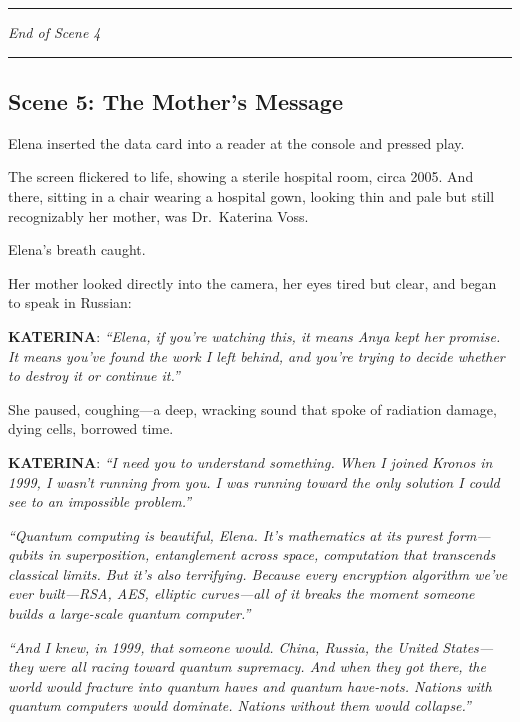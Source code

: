 \begin{center}\rule{0.5\linewidth}{0.5pt}\end{center}

\emph{End of Scene 4}

\begin{center}\rule{0.5\linewidth}{0.5pt}\end{center}

\hypertarget{scene-5-the-mothers-message}{%
\subsection{Scene 5: The Mother's Message}\label{scene-5-the-mothers-message}}

Elena inserted the data card into a reader at the console and pressed play.

The screen flickered to life, showing a sterile hospital room, circa 2005. And there, sitting in a chair wearing a hospital gown, looking thin and pale but still recognizably her mother, was Dr.~Katerina Voss.

Elena's breath caught.

Her mother looked directly into the camera, her eyes tired but clear, and began to speak in Russian:

\textbf{KATERINA}: \emph{``Elena, if you're watching this, it means Anya kept her promise. It means you've found the work I left behind, and you're trying to decide whether to destroy it or continue it.''}

She paused, coughing---a deep, wracking sound that spoke of radiation damage, dying cells, borrowed time.

\textbf{KATERINA}: \emph{``I need you to understand something. When I joined Kronos in 1999, I wasn't running from you. I was running toward the only solution I could see to an impossible problem.''}

\emph{``Quantum computing is beautiful, Elena. It's mathematics at its purest form---qubits in superposition, entanglement across space, computation that transcends classical limits. But it's also terrifying. Because every encryption algorithm we've ever built---RSA, AES, elliptic curves---all of it breaks the moment someone builds a large-scale quantum computer.''}

\emph{``And I knew, in 1999, that someone would. China, Russia, the United States---they were all racing toward quantum supremacy. And when they got there, the world would fracture into quantum haves and quantum have-nots. Nations with quantum computers would dominate. Nations without them would collapse.''}

